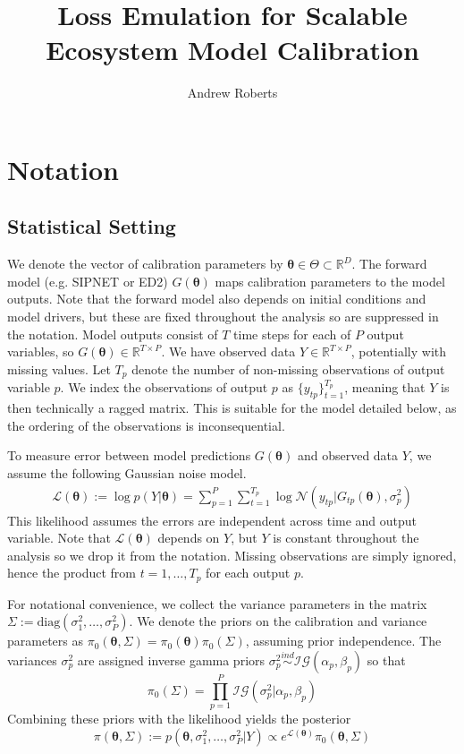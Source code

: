\documentclass[12pt]{article}
\title{Loss Emulation for Scalable Ecosystem Model Calibration}
\author{Andrew Roberts}
\newcommand{\R}{\mathbb{R}}
\newcommand{\btheta}{\boldsymbol{\theta}}
\begin{document}
\maketitle
\tableofcontents
\newpage

\section{Notation}

\subsection{Statistical Setting}
We denote the vector of calibration parameters by $\btheta \in \Theta \subset \R^D$. The forward model (e.g. SIPNET or ED2) $G(\btheta)$ maps calibration parameters to the model outputs. Note that the forward 
model also depends on initial conditions and model drivers, but these are fixed throughout the analysis so are suppressed in the notation. Model outputs consist 
of $T$ time steps for each of $P$ output variables, so $G(\btheta) \in \mathbb{R}^{T \times P}$. We have observed data $Y \in \mathbb{R}^{T \times P}$, potentially with missing values. Let $T_p$ denote the number 
of non-missing observations of output variable $p$. We index the observations of output $p$ as $\{y_{tp}\}_{t = 1}^{T_p}$, meaning that $Y$ is then technically a ragged matrix. 
This is suitable for the model detailed below, as the ordering of the observations is inconsequential. 

To measure error between model 
predictions $G(\btheta)$ and observed data $Y$, we assume the following Gaussian noise model. 
\begin{align*}
\mathcal{L}(\btheta) := \log p(Y|\mathbf{\btheta}) = \sum_{p = 1}^{P} \sum_{t = 1}^{T_p} \log \mathcal{N}\left(y_{tp}| G_{tp}(\btheta), \sigma_p^2 \right)
\end{align*}
This likelihood assumes the errors are independent across time and output variable. Note that $\mathcal{L}(\btheta)$ depends on $Y$, but $Y$ is constant throughout the analysis so we drop it from the notation. Missing 
observations are simply ignored, hence the product from $t = 1, \dots, T_p$ for each output $p$.

For notational convenience, we collect the variance parameters in the matrix $\Sigma := \text{diag}\left(\sigma_1^2, \dots, \sigma_P^2 \right)$. 
We denote the priors on the calibration and variance parameters as  $\pi_0(\btheta, \Sigma) = \pi_0(\btheta)\pi_0(\Sigma)$, assuming prior independence.  
The variances $\sigma_p^2$ are assigned inverse gamma priors $\sigma_p^2 \overset{ind}{\sim} \mathcal{IG}(\alpha_p, \beta_p)$ so that 
\[\pi_0(\Sigma) = \prod_{p = 1}^{P} \mathcal{IG}(\sigma_p^2|\alpha_p, \beta_p)\]
Combining these priors with the likelihood yields the posterior 
\[\pi(\btheta, \Sigma) := p(\btheta, \sigma_1^2, \dots, \sigma_P^2|Y) \propto e^{\mathcal{L}(\btheta)}\pi_0(\btheta, \Sigma)\]
\end{document}
